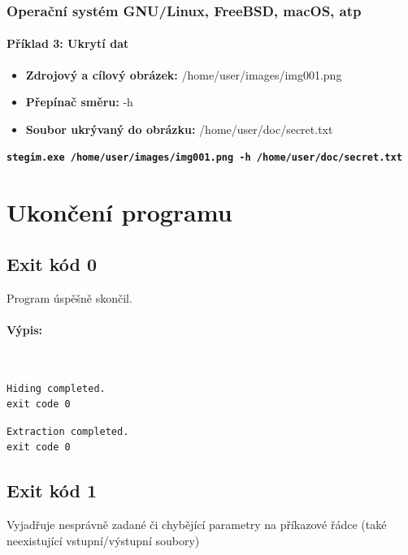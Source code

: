 \documentclass[12pt]{report}
\begin{document}
    \subsubsection{Operační systém GNU/Linux, FreeBSD, macOS, atp}

    \paragraph{Příklad 3: Ukrytí dat}
    \begin{itemize}
        \item \textbf{Zdrojový a cílový obrázek:} /home/user/images/img001.png
        \item \textbf{Přepínač směru:} -h
        \item \textbf{Soubor ukrývaný do obrázku:} /home/user/doc/secret.txt
    \end{itemize}
\texttt{\textbf{stegim.exe /home/user/images/img001.png -h /home/user/doc/secret.txt}}

    \section{Ukončení programu}

    \subsection{Exit kód 0}
    Program úspěšně skončil.

    \paragraph{Výpis:}\\
    \begin{mdframed}
        \begin{verbatim}
Hiding completed.
exit code 0
        \end{verbatim}
    \end{mdframed}

    \begin{mdframed}
        \begin{verbatim}
Extraction completed.
exit code 0
        \end{verbatim}
    \end{mdframed}

    \subsection{Exit kód 1}
    Vyjadřuje nesprávně zadané či chybějící parametry na příkazové řádce (také
    neexistující vstupní/výstupní soubory)\\
\end{document}
